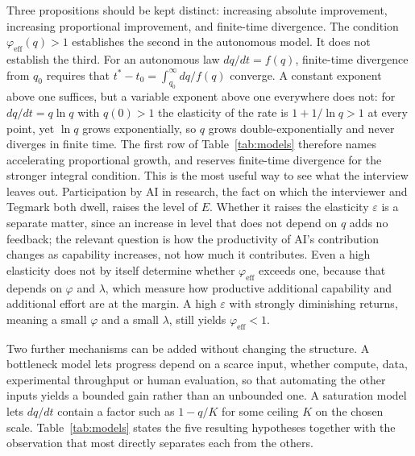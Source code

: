 \documentclass[11pt]{article}
\begin{document}
Three propositions should be kept distinct: increasing absolute improvement, increasing proportional improvement, and finite-time divergence. The condition $\varphi_{\mathrm{eff}}(q)>1$ establishes the second in the autonomous model. It does not establish the third. For an autonomous law $dq/dt=f(q)$, finite-time divergence from $q_0$ requires that $t^{*}-t_0=\int_{q_0}^{\infty}dq/f(q)$ converge. A constant exponent above one suffices, but a variable exponent above one everywhere does not: for $dq/dt=q\ln q$ with $q(0)>1$ the elasticity of the rate is $1+1/\ln q>1$ at every point, yet $\ln q$ grows exponentially, so $q$ grows double-exponentially and never diverges in finite time. The first row of Table~\ref{tab:models} therefore names accelerating proportional growth, and reserves finite-time divergence for the stronger integral condition. This is the most useful way to see what the interview leaves out. Participation by AI in research, the fact on which the interviewer and Tegmark both dwell, raises the level of $E$. Whether it raises the elasticity $\varepsilon$ is a separate matter, since an increase in level that does not depend on $q$ adds no feedback; the relevant question is how the productivity of AI's contribution changes as capability increases, not how much it contributes. Even a high elasticity does not by itself determine whether $\varphi_{\mathrm{eff}}$ exceeds one, because that depends on $\varphi$ and $\lambda$, which measure how productive additional capability and additional effort are at the margin. A high $\varepsilon$ with strongly diminishing returns, meaning a small $\varphi$ and a small $\lambda$, still yields $\varphi_{\mathrm{eff}}<1$.

Two further mechanisms can be added without changing the structure. A bottleneck model lets progress depend on a scarce input, whether compute, data, experimental throughput or human evaluation, so that automating the other inputs yields a bounded gain rather than an unbounded one. A saturation model lets $dq/dt$ contain a factor such as $1-q/K$ for some ceiling $K$ on the chosen scale. Table~\ref{tab:models} states the five resulting hypotheses together with the observation that most directly separates each from the others.
\end{document}
